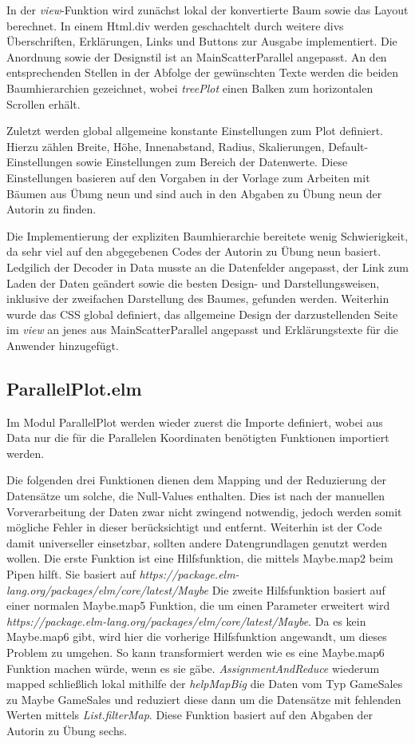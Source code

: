 \documentclass[usegeometry=true]{scrartcl}
\begin{document}
In der \textit{view}-Funktion wird zunächst lokal der konvertierte Baum sowie das Layout berechnet. In einem Html.div werden geschachtelt durch weitere divs Überschriften, Erklärungen, Links und Buttons zur Ausgabe implementiert. 
Die Anordnung sowie der Designstil ist an MainScatterParallel angepasst. An den entsprechenden Stellen in der Abfolge der gewünschten Texte werden die beiden Baumhierarchien gezeichnet, wobei \textit{treePlot} einen Balken zum horizontalen Scrollen erhält.

Zuletzt werden global allgemeine konstante Einstellungen zum Plot definiert. Hierzu zählen Breite, Höhe, Innenabstand, Radius, Skalierungen, Default-Einstellungen sowie Einstellungen zum Bereich der Datenwerte.
Diese Einstellungen basieren auf den Vorgaben in der Vorlage zum Arbeiten mit Bäumen aus Übung neun und sind auch in den Abgaben zu Übung neun der Autorin zu finden. 

Die Implementierung der expliziten Baumhierarchie bereitete wenig Schwierigkeit, da sehr viel auf den abgegebenen Codes der Autorin zu Übung neun basiert. 
Ledgilich der Decoder in Data musste an die Datenfelder angepasst, der Link zum Laden der Daten geändert sowie die besten Design- und Darstellungsweisen, inklusive der zweifachen Darstellung des Baumes, gefunden werden. 
Weiterhin wurde das CSS global definiert, das allgemeine Design der darzustellenden Seite im \textit{view} an jenes aus MainScatterParallel angepasst und Erklärungstexte für die Anwender hinzugefügt. 

\subsection{ParallelPlot.elm}
Im Modul ParallelPlot werden wieder zuerst die Importe definiert, wobei aus Data nur die für die Parallelen Koordinaten benötigten Funktionen importiert werden. 

Die folgenden drei Funktionen dienen dem Mapping und der Reduzierung der Datensätze um solche, die Null-Values enthalten. 
Dies ist nach der manuellen Vorverarbeitung der Daten zwar nicht zwingend notwendig, jedoch werden somit mögliche Fehler in dieser berücksichtigt und entfernt. 
Weiterhin ist der Code damit universeller einsetzbar, sollten andere Datengrundlagen genutzt werden wollen. 
Die erste Funktion ist eine Hilfsfunktion, die mittels Maybe.map2 beim Pipen hilft. Sie basiert auf \textit{https://package.elm-lang.org/packages/elm/core/latest/Maybe}
Die zweite Hilfsfunktion basiert auf einer normalen Maybe.map5 Funktion, die um einen Parameter erweitert wird \textit{https://package.elm-lang.org/packages/elm/core/latest/Maybe}. 
Da es kein Maybe.map6 gibt, wird hier die vorherige Hilfsfunktion angewandt, um dieses Problem zu umgehen. 
So kann transformiert werden wie es eine Maybe.map6 Funktion machen würde, wenn es sie gäbe.
\textit{AssignmentAndReduce} wiederum mapped schließlich lokal mithilfe der \textit{helpMapBig} die Daten vom Typ GameSales zu Maybe GameSales und reduziert diese dann um die Datensätze mit fehlenden Werten mittels \textit{List.filterMap}.
Diese Funktion basiert auf den Abgaben der Autorin zu Übung sechs.
\end{document}
